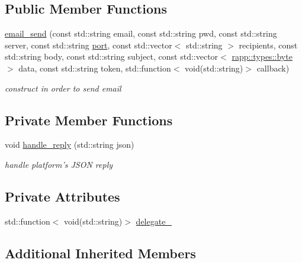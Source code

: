 \subsection*{Public Member Functions}
\begin{DoxyCompactItemize}
\item 
\hyperlink{classrapp_1_1cloud_1_1email__send_ade7d3dd80278c1975f74c1526e0d3cab}{email\-\_\-send} (const std\-::string email, const std\-::string pwd, const std\-::string server, const std\-::string \hyperlink{namespacerapp_1_1cloud_ae0e4cb6fd54bbf45234fc3c21f752b7a}{port}, const std\-::vector$<$ std\-::string $>$ recipients, const std\-::string body, const std\-::string subject, const std\-::vector$<$ \hyperlink{namespacerapp_1_1types_a1dbc9dc2ab4507d8fb58ac3a204d307b}{rapp\-::types\-::byte} $>$ data, const std\-::string token, std\-::function$<$ void(std\-::string)$>$ callback)
\begin{DoxyCompactList}\small\item\em construct in order to send email \end{DoxyCompactList}\end{DoxyCompactItemize}
\subsection*{Private Member Functions}
\begin{DoxyCompactItemize}
\item 
void \hyperlink{classrapp_1_1cloud_1_1email__send_a90e15e8336d8561a626f685aafc6c5a7}{handle\-\_\-reply} (std\-::string json)
\begin{DoxyCompactList}\small\item\em handle platform's J\-S\-O\-N reply \end{DoxyCompactList}\end{DoxyCompactItemize}
\subsection*{Private Attributes}
\begin{DoxyCompactItemize}
\item 
std\-::function$<$ void(std\-::string)$>$ \hyperlink{classrapp_1_1cloud_1_1email__send_a8411459df7614fa390cfa8351277ec4c}{delegate\-\_\-}
\end{DoxyCompactItemize}
\subsection*{Additional Inherited Members}


